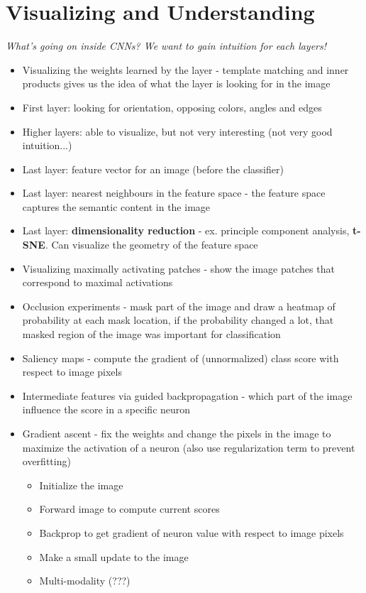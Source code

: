 \section{Visualizing and Understanding}
\textit{What's going on inside CNNs? We want to gain intuition for each layers!}
\begin{itemize}
	\item Visualizing the weights learned by the layer - template matching and inner products gives us the idea of what the layer is looking for in the image
	\item First layer: looking for orientation, opposing colors, angles and edges
	\item Higher layers: able to visualize, but not very interesting (not very good intuition...)
	\item Last layer: feature vector for an image (before the classifier)
	\item Last layer: nearest neighbours in the feature space - the feature space captures the semantic content in the image
	\item Last layer: \textbf{dimensionality reduction} - ex. principle component analysis, \textbf{t-SNE}. Can visualize the geometry of the feature space
	\item Visualizing maximally activating patches - show the image patches that correspond to maximal activations
	\item Occlusion experiments - mask part of the image and draw a heatmap of probability at each mask location, if the probability changed a lot, that masked region of the image was important for classification
	\item Saliency maps - compute the gradient of (unnormalized) class score with respect to image pixels
	\item Intermediate features via guided backpropagation - which part of the image influence the score in a specific neuron
	\item Gradient ascent - fix the weights and change the pixels in the image to maximize the activation of a neuron (also use regularization term to prevent overfitting)
	\begin{itemize}
		\item Initialize the image
		\item Forward image to compute current scores
		\item Backprop to get gradient of neuron value with respect to image pixels
		\item Make a small update to the image
		\item Multi-modality (???)

\end{itemize}
\end{itemize}
